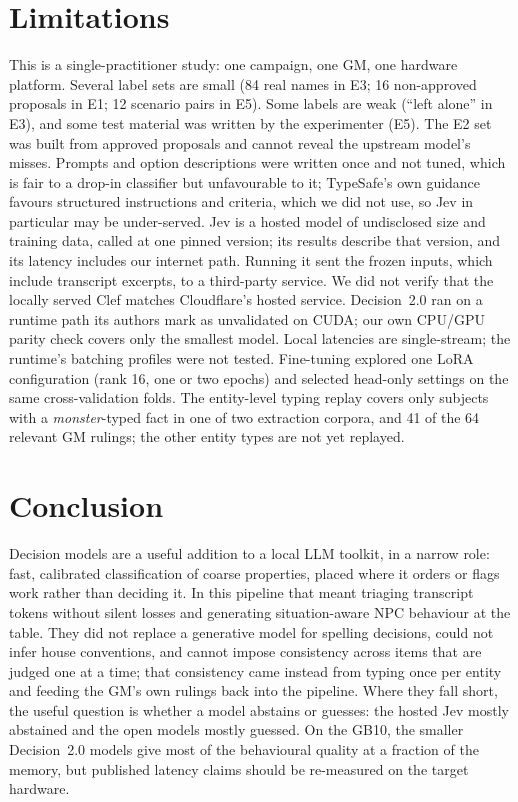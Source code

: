 \documentclass[11pt]{article}
\begin{document}
\section{Limitations}
This is a single-practitioner study: one campaign, one GM, one hardware platform. Several label sets
are small (84 real names in E3; 16 non-approved proposals in E1; 12 scenario pairs in E5). Some labels
are weak (``left alone'' in E3), and some test material was written by the experimenter (E5). The E2
set was built from approved proposals and cannot reveal the upstream model's misses. Prompts and
option descriptions were written once and not tuned, which is fair to a drop-in classifier but
unfavourable to it; TypeSafe's own guidance favours structured instructions and criteria, which we
did not use, so Jev in particular may be under-served. Jev is a hosted model of undisclosed size
and training data, called at one pinned version; its results describe that version, and its
latency includes our internet path. Running it sent the frozen inputs, which include transcript
excerpts, to a third-party service. We did not verify that the locally served Clef matches Cloudflare's hosted
service. Decision~2.0 ran on a runtime path its authors mark as unvalidated on CUDA; our own CPU/GPU
parity check covers only the smallest model. Local latencies are single-stream; the runtime's batching
profiles were not tested. Fine-tuning explored one LoRA configuration (rank 16, one or two epochs) and
selected head-only settings on the same cross-validation folds. The entity-level typing replay
covers only subjects with a \emph{monster}-typed fact in one of two extraction corpora, and 41 of the
64 relevant GM rulings; the other entity types are not yet replayed.

\section{Conclusion}
Decision models are a useful addition to a local LLM toolkit, in a narrow role: fast, calibrated
classification of coarse properties, placed where it orders or flags work rather than deciding it.
In this pipeline that meant triaging transcript tokens without silent losses and generating
situation-aware NPC behaviour at the table. They did not replace a generative model for spelling
decisions, could not infer house conventions, and cannot impose consistency across items
that are judged one at a time; that consistency came instead from typing once per entity and feeding
the GM's own rulings back into the pipeline. Where they fall short, the useful question is whether a
model abstains or guesses: the hosted Jev mostly abstained and the open models mostly guessed. On
the GB10, the smaller Decision~2.0 models give most of the behavioural quality at a fraction of the
memory, but published latency claims should be re-measured on the target hardware.
\end{document}
